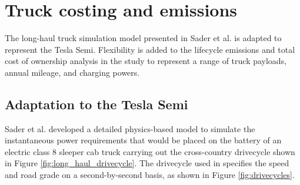 \section{Truck costing and emissions}
\label{sec:costs_emissions}

The long-haul truck simulation model presented in Sader et al. \cite{Sader_2023} is adapted to represent the Tesla Semi. Flexibility is added to the lifecycle emissions and total cost of ownership analysis in the study to represent a range of truck payloads, annual mileage, and charging powers. 

\subsection{Adaptation to the Tesla Semi}

Sader et al. \cite{Sader_2023} developed a detailed physics-based model to simulate the instantaneous power requirements that would be placed on the battery of an electric class 8 sleeper cab truck carrying out the cross-country drivecycle shown in Figure \ref{fig:long_haul_drivecycle}. The drivecycle used in \cite{Sader_2023} specifies the speed and road grade on a second-by-second basis, as shown in Figure \ref{fig:drivecycles}.

